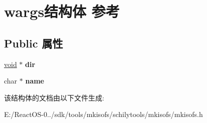 \hypertarget{structwargs}{}\section{wargs结构体 参考}
\label{structwargs}
\subsection*{Public 属性}
\begin{DoxyCompactItemize}
\item 
\mbox{\label{structwargs_aee665afc8950411dc597c0cf1052600d}} 
\hyperlink{interfacevoid}{void} $\ast$ {\bfseries dir}
\item 
\mbox{\label{structwargs_a1af98b56c31e05a6545427103dce8c77}} 
char $\ast$ {\bfseries name}
\end{DoxyCompactItemize}


该结构体的文档由以下文件生成\+:\begin{DoxyCompactItemize}
\item 
E\+:/\+React\+O\+S-\/0../sdk/tools/mkisofs/schilytools/mkisofs/mkisofs.\+h\end{DoxyCompactItemize}
